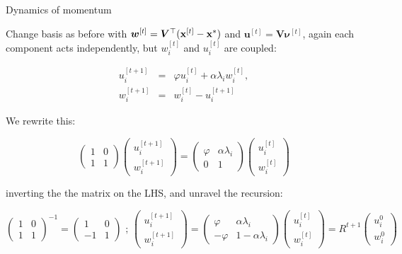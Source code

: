 \documentclass[11pt,compress,t,notes=noshow, xcolor=table]{beamer}
\begin{document}
\begin{vbframe}{Dynamics of momentum}
\begin{footnotesize}
Change basis as before with $\boldsymbol{w}^{[ t ] } = \bm{V}^\top (\mathbf{x}^{[ t ] } - \mathbf{x}^\ast)$ and $\boldsymbol{u}^{[ t ] } = \bm{V} \boldsymbol{\nu}^{[ t ] }$, again each component acts independently, but $w_i^{[ t ] }$ and $u_i^{[ t ] }$ are coupled: 

\begin{eqnarray*}
	u_i^{[ t+1 ] } &=& \varphi u_i^{[ t ] } + \alpha \lambda_i w_i^{[ t ] }, \\
	w_i^{[ t+1 ] } &=& w_i^{[ t ] } - u_i^{[ t+1 ] }
\end{eqnarray*}

We rewrite this: 

\begin{equation*}
\begin{pmatrix}
	1 & 0 \\
	1 & 1 
\end{pmatrix}  \begin{pmatrix}
u_i^{[ t+1 ] } \\
w_i^{[ t+1 ] }
\end{pmatrix} = 
\begin{pmatrix}
	\varphi & \alpha \lambda_i \\
	0 & 1 
\end{pmatrix}  \begin{pmatrix}
	u_i^{[ t ] } \\
	w_i^{[ t ] }
\end{pmatrix}
\end{equation*}

inverting the the matrix on the LHS, and unravel the recursion:


\begin{equation*}
\begin{pmatrix}
	1 & 0 \\
	1 & 1 
\end{pmatrix}^{-1} =\begin{pmatrix}
	1 & 0 \\
	-1 & 1 
\end{pmatrix}  \text{  ;  }
\begin{pmatrix}
		u_i^{[ t+1 ] } \\
		w_i^{[ t+1 ] }
	\end{pmatrix} = 
	\begin{pmatrix}
		\varphi & \alpha \lambda_i \\
		-\varphi & 1 - \alpha \lambda_i
	\end{pmatrix}  \begin{pmatrix}
		u_i^{[ t ] } \\
		w_i^{[ t ] }
	\end{pmatrix} = R^{ t+1 }  \begin{pmatrix}
	u_i^{0} \\
	w_i^{0}
\end{pmatrix}


\end{equation*}
\end{footnotesize}
\end{vbframe}
\end{document}
